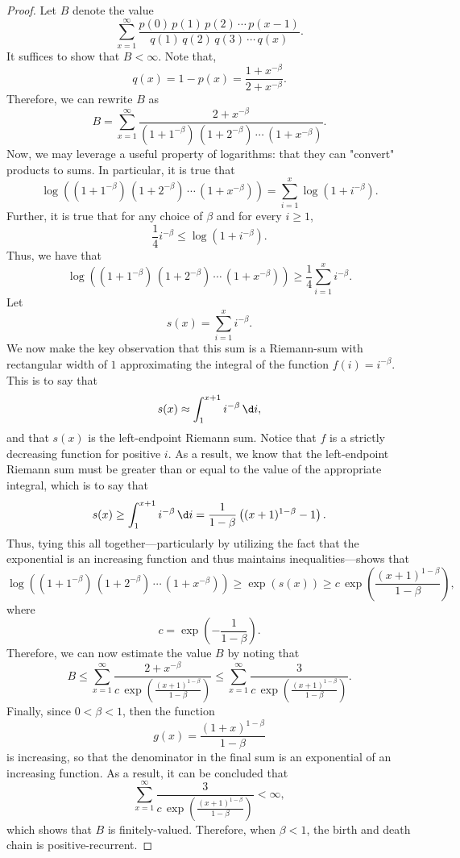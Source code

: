 \begin{proof}
    Let $B$ denote the value
    \[
        \sum_{x=1}^{\infty} \frac{p(0)\, p(1)\, p(2)\, \cdots\, p(x-1)}{q(1)\, q(2)\, q(3)\, \cdots \,
        q(x)}.
    \]
    It suffices to show that $B < \infty$. Note that,
    \[
        q(x) = 1 - p(x) = \frac{1+x^{-\beta}}{2+x^{-\beta}}.
    \]
    Therefore, we can rewrite $B$ as
    \[
        B = \sum_{x=1}^{\infty} \frac{2+x^{-\beta}}{(1+1^{-\beta})\, (1+2^{-\beta})\, \cdots \,
        (1+x^{-\beta})}.  
    \]
    Now, we may leverage a useful property of logarithms: that they can "convert" products to sums. In
    particular, it is true that
    \[
        \log\left((1+1^{-\beta})\, (1+2^{-\beta})\, \cdots \, (1+x^{-\beta})\right) = \sum_{i=1}^x
        \log\left(1+i^{-\beta}\right).
    \]
    Further, it is true that for any choice of $\beta$ and for every $i \geq 1$,
    \[
        \frac{1}{4} i^{-\beta} \leq \log\left(1+i^{-\beta}\right).
    \]
    Thus, we have that
    \[
        \log\left((1+1^{-\beta})\, (1+2^{-\beta})\, \cdots \, (1+x^{-\beta})\right) \geq
        \frac{1}{4}\sum_{i=1}^x i^{-\beta}.
    \]
    Let
    \[
        s(x) = \sum_{i=1}^x i^{-\beta}.
    \]
    We now make the key observation that this sum is a Riemann-sum with rectangular width of $1$
    approximating the integral of the function $f(i) = i^{-\beta}$. This is to say that
    \[
        s(x) \approx \int_1^{x+1} i^{-\beta} \, \d i,
    \]
    and that $s(x)$ is the left-endpoint Riemann sum. Notice that $f$ is a strictly decreasing function
    for positive $i$. As a result, we know that the left-endpoint Riemann sum must be greater than or
    equal to the value of the appropriate integral, which is to say that
    \[
        s(x) \geq \int_1^{x+1} i^{-\beta} \, \d i = \frac{1}{1-\beta}\left((x+1)^{1-\beta} - 1\right).
    \]
    Thus, tying this all together---particularly by utilizing the fact that the exponential is an
    increasing function and thus maintains inequalities---shows that
    \[
        \log\left((1+1^{-\beta})\, (1+2^{-\beta})\, \cdots \, (1+x^{-\beta})\right) \geq \exp(s(x)) \geq
        c \,\exp\left(\frac{(x+1)^{1-\beta}}{1-\beta}\right),
    \]
    where
    \[
        c = \exp\left(-\frac{1}{1-\beta}\right).  
    \]
    Therefore, we can now estimate the value $B$ by noting that
    \[
        B \leq \sum_{x=1}^{\infty} \frac{2+x^{-\beta}}{c\,
        \exp\left(\frac{(x+1)^{1-\beta}}{1-\beta}\right)} \leq \sum_{x=1}^{\infty} \frac{3}{c\,
        \exp\left(\frac{(x+1)^{1-\beta}}{1-\beta}\right)}.
    \]
    Finally, since $0 < \beta < 1$, then the function
    \[
        g(x) = \frac{(1+x)^{1-\beta}}{1-\beta}
    \]
    is increasing, so that the denominator in the final sum is an exponential of an increasing function.
    As a result, it can be concluded that
    \[
        \sum_{x=1}^{\infty} \frac{3}{c\, \exp\left(\frac{(x+1)^{1-\beta}}{1-\beta}\right)} < \infty,
    \]
    which shows that $B$ is finitely-valued. Therefore, when $\beta < 1$, the birth and death chain is
    positive-recurrent.
\end{proof}

